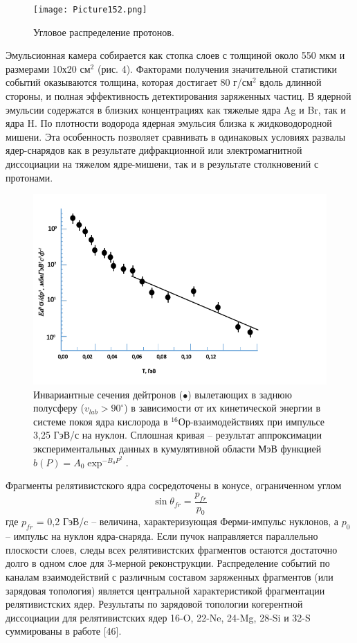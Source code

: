 \documentclass[fontsize=14pt]{scrreport}
\begin{document}
\begin{figure}[!ht]
\centering
\texttt{[image: Picture152.png]}
\caption{ Угловое распределение протонов.}
\label{figdeu}
\end{figure}



Эмульсионная камера собирается как стопка слоев с толщиной около 550 мкм и размерами 10х20 см$^{2}$ (рис. 4). Факторами получения значительной статистики событий оказываются толщина, которая достигает 80 г/см$^{2}$ вдоль длинной стороны, и полная эффективность детектирования заряженных частиц. В ядерной эмульсии содержатся в близких концентрациях как тяжелые ядра Ag и Br, так и ядра H. По плотности водорода ядерная эмульсия близка к жидководородной мишени. Эта особенность позволяет сравнивать в одинаковых условиях развалы ядер-снарядов как в результате дифракционной или электромагнитной диссоциации на тяжелом ядре-мишени, так и в результате столкновений с протонами. 


\begin{figure}[!ht]
\centerline{\includegraphics{picture5.png}}
\caption{Инвариантные сечения  дейтронов ($\bullet$) вылетающих в заднюю полусферу ($v_{lab}>90^{\circ}$) в зависимости от их кинетической энергии в системе покоя ядра кислорода в $^{16}$Ор-взаимодействиях при импульсе 3,25 ГэВ/с на нуклон. Сплошная кривая – результат аппроксимации экспериментальных данных в кумулятивной области  МэВ функцией $b(P) = A_{0}\exp^{-B_{0}P^{2}}$.}
\label{fig4}
\end{figure}

Фрагменты релятивистского ядра сосредоточены в конусе, ограниченном углом
\begin{equation}
    \sin\theta_{fr}=\frac{p_{fr}}{p_{0}}
    \label{1}
\end{equation}
где $p_{fr}$ = 0,2 ГэВ/c – величина, характеризующая Ферми-импульс нуклонов, а $p_{0}$ – импульс на нуклон ядра-снаряда. Если пучок направляется параллельно плоскости слоев, следы всех релятивистских фрагментов остаются достаточно долго в одном слое для 3-мерной реконструкции. Распределение событий по каналам взаимодействий с различным составом заряженных фрагментов (или зарядовая топология) является центральной характеристикой фрагментации релятивистских ядер. Результаты по зарядовой топологии когерентной диссоциации для релятивистских ядер 16-O, 22-Ne, 24-Mg, 28-Si и 32-S суммированы в работе [46].
\end{document}
